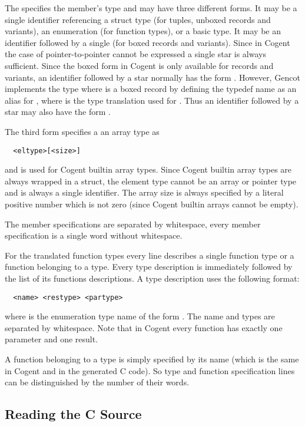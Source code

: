 The  specifies the member's type and may have three different forms. It may be a single 
identifier referencing a struct type (for tuples, unboxed records and variants), an enumeration 
(for function types), or a basic type. It may be an identifier followed by a single  
(for boxed records and variants). Since in Cogent the case of pointer-to-pointer cannot be expressed
a single star is always sufficient. Since the boxed form in Cogent is only available for records and
variants, an identifier followed by a star normally has the form . However, Gencot implements
the type  where  is a boxed record by defining the typedef name 
as an alias for , where  is the type translation used for . Thus an 
identifier followed by a star may also have the form .

The third form specifies a an array type as
\begin{verbatim}
  <eltype>[<size>]
\end{verbatim}
and is used for Cogent builtin array types. Since Cogent builtin array types are always wrapped in a
struct, the element type  cannot be an array or pointer type and is always a single identifier. 
The array size  is always specified by a literal positive number which is not zero (since 
Cogent builtin arrays cannot be empty).

The member specifications are separated by whitespace, every member specification is a single word
without whitespace. 

For the translated function types every line describes a single function type or a function belonging 
to a type. Every type description is immediately followed by the list of its functions descriptions.
A type description uses the following format:
\begin{verbatim}
  <name> <restype> <partype>
\end{verbatim}
where  is the enumeration type name of the form . The name and types are
separated by whitespace. Note that in Cogent every function has exactly one parameter and one result. 

A function belonging to 
a type is simply specified by its name (which is the same in Cogent and in the generated C code).
So type and function specification lines can be distinguished by the number of their words.

\subsection{Reading the C Source}
\label{impl-ctypinfo-read}

